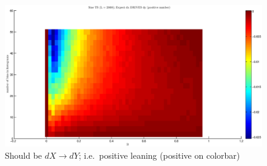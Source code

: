 \documentclass[a4paper,11pt]{article}
\begin{document}
\begin{figure}[!H]
\includegraphics[scale=0.55]{SineTSdxdy.eps}
\caption{Should be $dX\rightarrow dY$; i.e.\ positive leaning (positive on colorbar)}
\end{figure}
\end{document}
